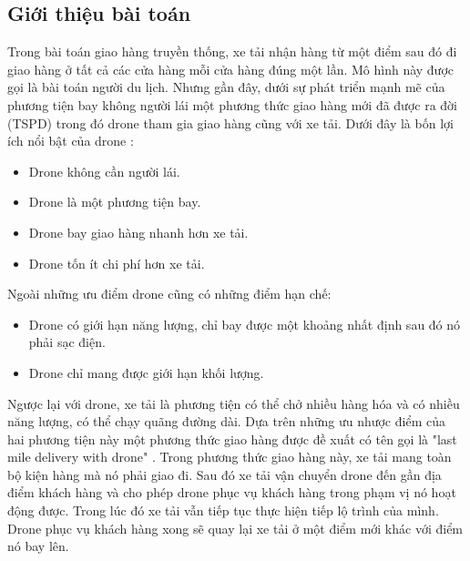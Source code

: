 \documentclass[a4paper,12pt]{report}
\begin{document}
\subsection{Giới thiệu bài toán}
Trong bài toán giao hàng truyền thống, xe tải nhận hàng từ một điểm sau đó đi giao hàng ở tất cả các cửa hàng mỗi cửa hàng đúng một lần. Mô hình này được gọi là bài toán người du lịch. Nhưng gần đây, dưới sự phát triển mạnh mẽ của phương tiện bay không người lái một phương thức giao hàng mới đã được ra đời (\ac{TSPD}) trong đó drone tham gia giao hàng cũng với xe tải. Dưới đây là bốn lợi ích nổi bật của drone \cite{main} :
\begin{itemize}
\item Drone không cần người lái.
\item Drone là một phương tiện bay.
\item Drone bay giao hàng nhanh hơn xe tải.
\item Drone tốn ít chi phí hơn xe tải.
\end{itemize}

Ngoài những ưu điểm drone cũng có những điểm hạn chế:

\begin{itemize}
\item Drone có giới hạn năng lượng, chỉ bay được một khoảng nhất định sau đó nó phải sạc điện.
\item Drone chỉ mang được giới hạn khối lượng.
\end{itemize}

Ngược lại với drone, xe tải là phương tiện có thể chở nhiều hàng hóa và có nhiều năng lượng, có thể chạy quãng đường dài. Dựa trên những ưu nhược điểm của hai phương tiện này một phương thức giao hàng được đề xuất có tên gọi là "last mile delivery with drone" \cite{bahiwww}. Trong phương thức giao hàng này, xe tải mang toàn bộ kiện hàng mà nó phải giao đi. Sau đó xe tải vận chuyển drone đến gần địa điểm khách hàng và cho phép drone phục vụ khách hàng trong phạm vị nó hoạt động được. Trong lúc đó xe tải vẫn tiếp tục thực hiện tiếp lộ trình của mình.  Drone phục vụ khách hàng xong sẽ quay lại xe tải ở một điểm mới khác với điểm nó bay lên\cite{main}. 
\end{document}
